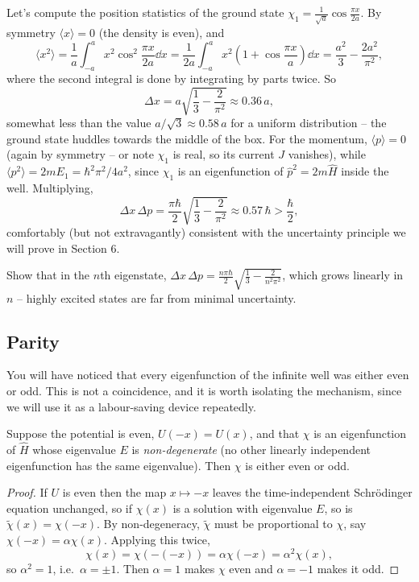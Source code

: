 \begin{example}
    Let's compute the position statistics of the ground state $\chi_1 = \frac{1}{\sqrt{a}}\cos\frac{\pi x}{2a}$. By symmetry $\langle x \rangle = 0$ (the density is even), and
    $$
    \langle x^2 \rangle = \frac{1}{a} \int_{-a}^{a} x^2 \cos^2 \frac{\pi x}{2 a} \dd x
    = \frac{1}{2a}\int_{-a}^{a} x^2 \left( 1 + \cos \frac{\pi x}{a} \right) \dd x
    = \frac{a^2}{3} - \frac{2 a^2}{\pi^2},
    $$
    where the second integral is done by integrating by parts twice. So
    $$
    \Delta x = a \sqrt{\frac{1}{3} - \frac{2}{\pi^2}} \approx 0.36 \, a,
    $$
    somewhat less than the value $a/\sqrt{3} \approx 0.58 \, a$ for a uniform distribution -- the ground state huddles towards the middle of the box. For the momentum, $\langle p \rangle = 0$ (again by symmetry -- or note $\chi_1$ is real, so its current $J$ vanishes), while $\langle p^2 \rangle = 2m E_1 = \hbar^2 \pi^2/4a^2$, since $\chi_1$ is an eigenfunction of $\hat{p}^2 = 2m\hat{H}$ inside the well. Multiplying,
    $$
    \Delta x \, \Delta p = \frac{\pi \hbar}{2} \sqrt{\frac{1}{3} - \frac{2}{\pi^2}} \approx 0.57 \, \hbar > \frac{\hbar}{2},
    $$
    comfortably (but not extravagantly) consistent with the uncertainty principle we will prove in Section 6.
\end{example}

\begin{exercise}
    Show that in the $n$th eigenstate, $\Delta x \, \Delta p = \frac{n \pi \hbar}{2}\sqrt{\frac{1}{3} - \frac{2}{n^2\pi^2}}$, which grows linearly in $n$ -- highly excited states are far from minimal uncertainty.
\end{exercise}

\subsection{Parity}

You will have noticed that every eigenfunction of the infinite well was either even or odd. This is not a coincidence, and it is worth isolating the mechanism, since we will use it as a labour-saving device repeatedly.

\begin{proposition}
    Suppose the potential is even, $U(-x) = U(x)$, and that $\chi$ is an eigenfunction of $\hat{H}$ whose eigenvalue $E$ is \emph{non-degenerate} (no other linearly independent eigenfunction has the same eigenvalue). Then $\chi$ is either even or odd.
\end{proposition}
\begin{proof}
    If $U$ is even then the map $x \mapsto -x$ leaves the time-independent Schr\"odinger equation unchanged, so if $\chi(x)$ is a solution with eigenvalue $E$, so is $\tilde{\chi}(x) = \chi(-x)$. By non-degeneracy, $\tilde{\chi}$ must be proportional to $\chi$, say $\chi(-x) = \alpha \chi(x)$. Applying this twice,
    $$
    \chi(x) = \chi(-(-x)) = \alpha \chi(-x) = \alpha^2 \chi(x),
    $$
    so $\alpha^2 = 1$, i.e.\ $\alpha = \pm 1$. Then $\alpha = 1$ makes $\chi$ even and $\alpha = -1$ makes it odd.
\end{proof}

